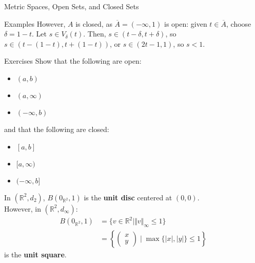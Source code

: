 \documentclass[10pt]{extarticle}
\newcommand{\R}{\mathbb{R}}
\begin{document}
\begin{problem}{Metric Spaces, Open Sets, and Closed Sets}
\begin{problem}{Examples}
      However, $A$ is closed, as $\overline{A} = (-\infty,1)$ is open: given $t\in \overline{A}$, choose $\delta = 1-t$. Let $s\in V_{\delta}(t)$. Then, $s\in (t-\delta, t+\delta)$, so $s\in (t-(1-t),t + (1-t))$, or $s\in(2t-1,1)$, so $s < 1$.
    \end{problem}
    \begin{problem}{Exercises}
      Show that the following are open:
      \begin{itemize}
        \item $(a,b)$
        \item $(a,\infty)$
        \item $(-\infty,b)$
      \end{itemize}
      and that the following are closed:
      \begin{itemize}
        \item $[a,b]$
        \item $[a,\infty)$
        \item $(-\infty,b]$
      \end{itemize}
    \end{problem}
    In $(\R^2,d_2)$, $B(0_{\R^2},1)$ is the \textbf{unit disc} centered at $(0,0)$.\\

    However, in $(\R^2,d_{\infty})$:
    \begin{align*}
      B(0_{\R^2},1) &= \{v\in\R^2 \mid \Vert v \Vert_{\infty} \leq 1\}\\
                    &= \left\{\begin{pmatrix}x\\y\end{pmatrix}\mid \max\{|x|,|y|\}\leq 1\right\}
    \end{align*}
    is the \textbf{unit square}.
  \end{problem}
\end{document}

